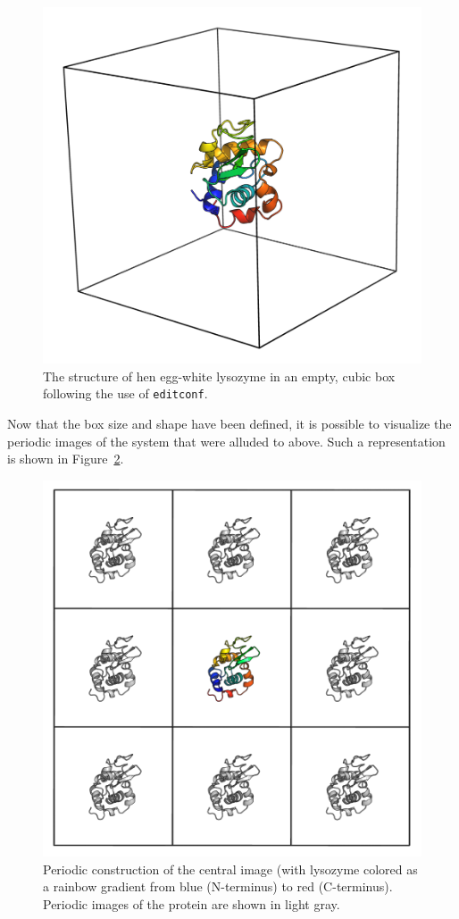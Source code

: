 \documentclass[9pt,tutorial,pubversion]{livecoms}
\begin{document}
\begin{figure}[H]
\centering
\includegraphics{1AKI_1box}
\caption{The structure of hen egg-white lysozyme in an empty, cubic box following the use of \texttt{editconf}.}
\label{lyso_box_fig}
\end{figure}

Now that the box size and shape have been defined, it is possible to visualize the periodic images of the system that were alluded to above. Such a representation is shown in Figure~\ref{lyso_boxes_fig}.

\begin{figure}[h]
\centering
\includegraphics{1AKI_boxes}
\caption{Periodic construction of the central image (with lysozyme colored as a rainbow gradient from blue (N-terminus) to red (C-terminus). Periodic images of the protein are shown in light gray.}
\label{lyso_boxes_fig}
\end{figure}
\end{document}
